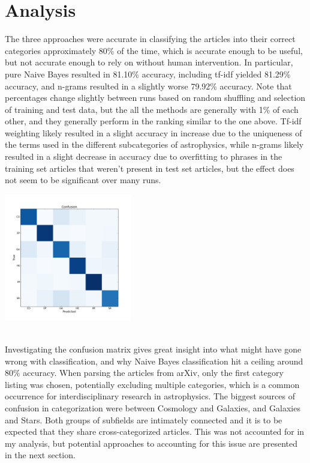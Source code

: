 \documentclass[]{article}
\begin{document}
\section*{Analysis}
The three approaches were accurate in classifying the articles into their correct categories approximately 80\% of the time, which is accurate enough to be useful, but not accurate enough to rely on without human intervention. In particular, pure Naive Bayes resulted in 81.10\% accuracy, including tf-idf yielded 81.29\% accuracy, and n-grams resulted in a slightly worse 79.92\% accuracy. Note that percentages change slightly between runs based on random shuffling and selection of training and test data, but the all the methods are generally with 1\% of each other, and they generally perform in the ranking similar to the one above. Tf-idf weighting likely resulted in a slight accuracy in increase due to the uniqueness of the terms used in the different subcategories of astrophysics, while n-grams likely resulted in a slight decrease in accuracy due to overfitting to phrases in the training set articles that weren't present in test set articles, but the effect does not seem to be significant over many runs.
\\
\centerline{\includegraphics[width=210px]{confusion}}
\\
Investigating the confusion matrix gives great insight into what might have gone wrong with classification, and why Naive Bayes classification hit a ceiling around 80\% accuracy. When parsing the articles from arXiv, only the first category listing was chosen, potentially excluding multiple categories, which is a common occurrence for interdisciplinary research in astrophysics. The biggest sources of confusion in categorization were between Cosmology and Galaxies, and Galaxies and Stars. Both groups of subfields are intimately connected and it is to be expected that they share cross-categorized articles. This was not accounted for in my analysis, but potential approaches to accounting for this issue are presented in the next section.
\end{document}
